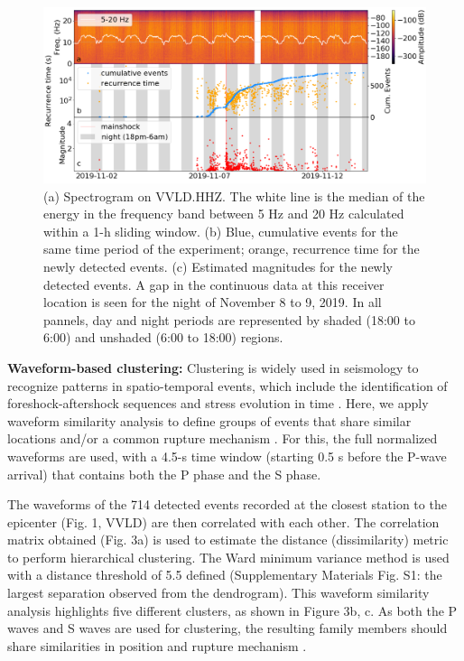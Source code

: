 \documentclass[a4paper,12pt,twoside]{article}
\begin{document}
\begin{figure}
    \centering
     \includegraphics[width=1\linewidth]{spec_rec_mag.png}    
     \caption{(a) Spectrogram on VVLD.HHZ. The white line is the median of the energy in the frequency band between 5 Hz and 20 Hz calculated within a 1-h sliding window. (b) Blue, cumulative events for the same time period of the experiment; orange, recurrence time for the newly detected events. (c) Estimated magnitudes for the newly detected events. A gap in the continuous data at this receiver location is seen for the night of November 8 to 9, 2019. In all pannels, day and night periods are represented by shaded (18:00 to 6:00) and unshaded (6:00 to 18:00) regions.}
\end{figure}    \label{fig:spectrum}


{\bf Waveform-based clustering:} Clustering is widely used in seismology to recognize patterns in spatio-temporal events, which include the identification of foreshock-aftershock sequences and stress evolution in time \citep[\emph{e.g.},][]{Kagan_1991_LTE, wehling_2013_IDT, Cesca_2014_SMC, Ellsworth_2018_NIE}. Here, we apply waveform similarity analysis \citep{Cattaneo_1999_WSA} to define groups of events that share similar locations and/or a common rupture mechanism \citep{Kagan_1991_LTE, wehling_2013_IDT, Cesca_2014_SMC, Ellsworth_2018_NIE, Cattaneo_1999_WSA}. For this, the full normalized waveforms are used, with a 4.5-s time window (starting 0.5 s before the P-wave arrival) that contains both the P phase and the S phase. 

The waveforms of the 714 detected events recorded at the closest station to the epicenter (Fig. 1, VVLD) are then correlated with each other. The correlation matrix obtained (Fig. 3a) is used to estimate the distance (dissimilarity) metric to perform hierarchical clustering. The Ward minimum variance method is used \citep{Ward_1963_HGO} with  a distance threshold of 5.5 defined (Supplementary Materials Fig. S1: the largest separation observed from the dendrogram). This waveform similarity analysis highlights five different clusters, as shown in Figure 3b, c. As both the P waves and S waves are used for clustering, the resulting family members should share similarities in position and rupture mechanism \citep{Kagan_1991_LTE, wehling_2013_IDT, Cesca_2014_SMC, Ellsworth_2018_NIE, Cattaneo_1999_WSA}.
\end{document}
